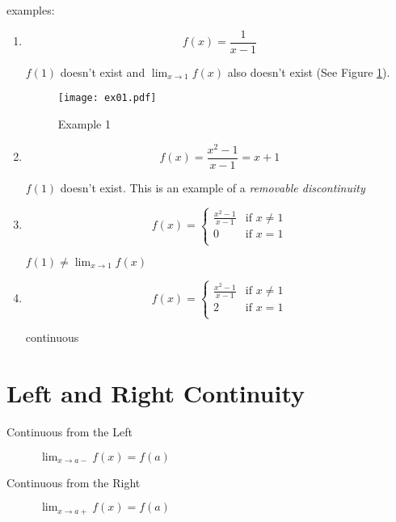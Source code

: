 \documentclass[letterpaper, landscape]{exam}
\begin{document}
  examples:
  \begin{enumerate}
    \item 
      \[
        f(x) = \frac{1}{x - 1}
      \]
      
      $f(1)$ doesn't exist and $\lim_{x \to 1} f(x)$ also doesn't exist (See Figure
      \ref{fig:ex01}).

      \begin{figure}[H]
        \centering
        \texttt{[image: ex01.pdf]}
        \caption{Example 1}
        \label{fig:ex01}
      \end{figure}

    \item 
      \[
        f(x) = \frac{x^2 - 1}{x - 1} = x + 1
      \]
      
      $f(1)$ doesn't exist. This is an example of a {\em removable discontinuity}

    \item
        \[
          f(x) = 
            \begin{cases}
              \frac{x^2 - 1}{x - 1} & \text{if } x \neq 1 \\
              0                     & \text{if } x = 1 \\
            \end{cases}
        \]

        $f(1) \neq\lim_{x \to 1} f(x)$

    \item
        \[
          f(x) = 
            \begin{cases}
              \frac{x^2 - 1}{x - 1} & \text{if } x \neq 1 \\
              2                     & \text{if } x = 1 \\
            \end{cases}
        \]

        continuous

  \end{enumerate}

  \section{Left and Right Continuity}
  
  \begin{description}
    \item[Continuous from the Left] $\lim_{x \to a-} f(x) = f(a)$ 
    \item[Continuous from the Right] $\lim_{x \to a+} f(x) = f(a)$ 
  \end{description}
\end{document}
